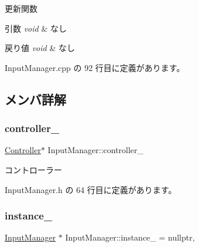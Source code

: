 更新関数 


\begin{DoxyParams}{引数}
{\em void} & なし \\
\hline
\end{DoxyParams}

\begin{DoxyRetVals}{戻り値}
{\em void} & なし \\
\hline
\end{DoxyRetVals}


 Input\+Manager.\+cpp の 92 行目に定義があります。



\subsection{メンバ詳解}
\mbox{\label{class_input_manager_ae0edcd4021e3dba96411944cb4d246d5}} 
\subsubsection{\texorpdfstring{controller\+\_\+}{controller\_}}
{\footnotesize\ttfamily \mbox{\hyperlink{class_controller}{Controller}}$\ast$ Input\+Manager\+::controller\+\_\+\hspace{0.3cm}{\ttfamily [private]}}



コントローラー 



 Input\+Manager.\+h の 64 行目に定義があります。

\mbox{\label{class_input_manager_af02cbb6e283b9aff50fa94f120f0e1db}} 
\subsubsection{\texorpdfstring{instance\+\_\+}{instance\_}}
{\footnotesize\ttfamily \mbox{\hyperlink{class_input_manager}{Input\+Manager}} $\ast$ Input\+Manager\+::instance\+\_\+ = nullptr\hspace{0.3cm}{\ttfamily [static]}, {\ttfamily [private]}}



